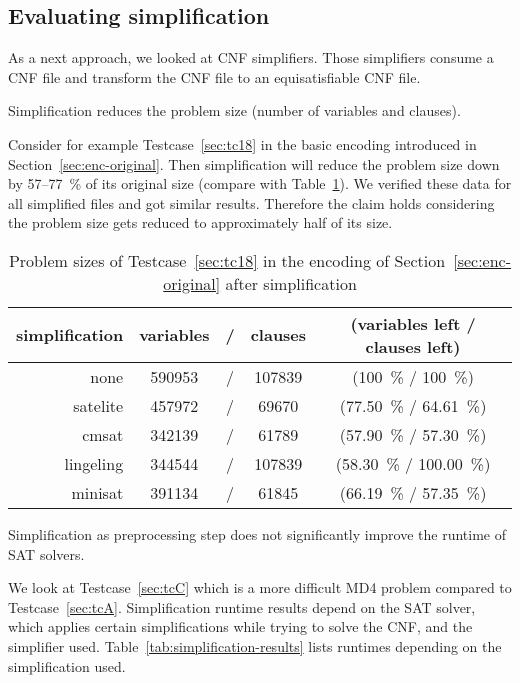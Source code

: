 \subsection{Evaluating simplification}
\label{sec:results-simplification}
%
As a next approach, we looked at CNF simplifiers. Those simplifiers consume a
CNF file and transform the CNF file to an equisatisfiable CNF file.

\begin{prop}
  Simplification reduces the problem size (number of variables and clauses).
\end{prop}

Consider for example Testcase~\ref{sec:tc18} in the basic encoding introduced
in Section~\ref{sec:enc-original}. Then simplification will reduce the problem
size down by 57--77~\% of its original size (compare with Table~\ref{tab:simpl-size}).
We verified these data for all simplified files and got similar results.
Therefore the claim holds considering the problem size gets reduced to
approximately half of its size.

\begin{table}[!h]
  \begin{center}
    \begin{tabular}{rcccc}
      \textbf{simplification} & \textbf{variables} &/& \textbf{clauses} & \textbf{(variables left / clauses left)} \\
    \hline
                none &    590953 &/& 107839  & (100~\% / 100~\%) \\
            satelite &    457972 &/& 69670   & (77.50~\% / 64.61~\%) \\
               cmsat &    342139 &/& 61789   & (57.90~\% / 57.30~\%) \\
           lingeling &    344544 &/& 107839  & (58.30~\% / 100.00~\%) \\
             minisat &    391134 &/& 61845   & (66.19~\% / 57.35~\%)
    \end{tabular}
    \caption{
        Problem sizes of Testcase~\ref{sec:tc18} in the encoding of
        Section~\ref{sec:enc-original} after simplification
    }
    \label{tab:simpl-size}
  \end{center}
\end{table}

\begin{prop}
  Simplification as preprocessing step does not significantly improve the runtime of SAT solvers.
\end{prop}
%
We look at Testcase~\ref{sec:tcC} which is a more difficult MD4 problem
compared to Testcase~\ref{sec:tcA}. Simplification runtime results depend on the
SAT solver, which applies certain simplifications while trying to solve the
CNF, and the simplifier used. Table~\ref{tab:simplification-results}
lists runtimes depending on the simplification used.

